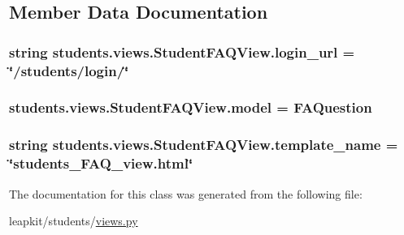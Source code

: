 \subsection{Member Data Documentation}
\hypertarget{classstudents_1_1views_1_1_student_f_a_q_view_a187c58fd089481cf81e7bbb14e0c65bd}{
\subsubsection[{login\-\_\-url}]{\setlength{\rightskip}{0pt plus 5cm}string students.\-views.\-Student\-F\-A\-Q\-View.\-login\-\_\-url = \char`\"{}/students/login/\char`\"{}\hspace{0.3cm}{\ttfamily [static]}}}\label{classstudents_1_1views_1_1_student_f_a_q_view_a187c58fd089481cf81e7bbb14e0c65bd}
\hypertarget{classstudents_1_1views_1_1_student_f_a_q_view_a4bf4e4cb8a13b7d970373e37fe67ce74}{
\subsubsection[{model}]{\setlength{\rightskip}{0pt plus 5cm}students.\-views.\-Student\-F\-A\-Q\-View.\-model = F\-A\-Question\hspace{0.3cm}{\ttfamily [static]}}}\label{classstudents_1_1views_1_1_student_f_a_q_view_a4bf4e4cb8a13b7d970373e37fe67ce74}
\hypertarget{classstudents_1_1views_1_1_student_f_a_q_view_a15ab67fe5f4e7cdfcdca7459dbc3c8df}{
\subsubsection[{template\-\_\-name}]{\setlength{\rightskip}{0pt plus 5cm}string students.\-views.\-Student\-F\-A\-Q\-View.\-template\-\_\-name = \char`\"{}students\-\_\-\-F\-A\-Q\-\_\-view.\-html\char`\"{}\hspace{0.3cm}{\ttfamily [static]}}}\label{classstudents_1_1views_1_1_student_f_a_q_view_a15ab67fe5f4e7cdfcdca7459dbc3c8df}


The documentation for this class was generated from the following file\-:\begin{DoxyCompactItemize}
\item 
leapkit/students/\hyperlink{views_8py}{views.\-py}\end{DoxyCompactItemize}
